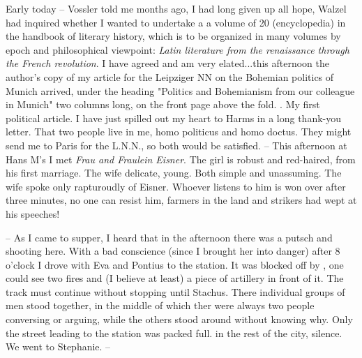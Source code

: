 
Early today -- Vossler told me months ago, I had long given up all hope, Walzel had inquired whether I wanted to undertake a a volume of 20 (encyclopedia)  in the handbook of literary history, which is to be organized in many volumes by epoch and philosophical viewpoint: \textit{Latin literature from the renaissance through the French revolution}. I have agreed and am very elated...this afternoon the author's copy of my article for the Leipziger NN on the Bohemian politics of Munich arrived, under the heading "Politics and Bohemianism from our  colleague in Munich" two columns long, on the front page above the fold. . My first political article. I have just spilled out my heart to Harms in a long thank-you letter. That two people live in me, homo politicus and homo doctus. They might send me to Paris for the L.N.N., so both would be satisfied. -- This afternoon at Hans M's I met \textit{Frau and Fraulein Eisner}. The girl is robust and red-haired, from his first marriage. The wife delicate, young. Both simple and unassuming. The wife spoke only rapturoudly of Eisner. Whoever listens to him is won over after three minutes, no one can resist him, farmers in the land and strikers had wept at his speeches!

-- As I came to supper, I heard that in the afternoon there was a putsch and shooting here. With a bad conscience (since I brought her into danger) after 8 o'clock I drove with Eva and Pontius to the station. It was blocked off by , one could see two fires and (I believe at least) a piece of artillery in front of it. The track must continue without stopping until Stachus. There individual groups of men stood together, in the middle of which ther were always two people conversing or arguing, while the others stood around without knowing why. Only the street leading to the station was packed full. in the rest of the city, silence. We went to Stephanie. -- \missing